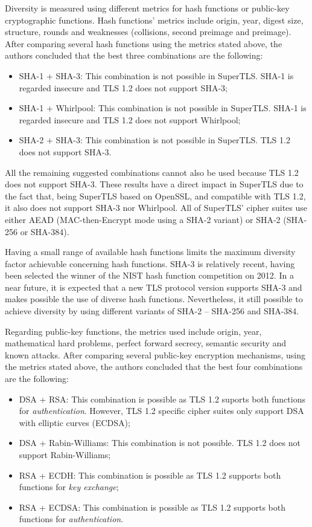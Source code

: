 \documentclass{sig-alternate-05-2015}
\begin{document}
Diversity is measured using different metrics for hash functions or public-key cryptographic functions. Hash functions' metrics include origin, year, digest size, structure, rounds and weaknesses (collisions, second preimage and preimage).
After comparing several hash functions using the metrics stated above, the authors concluded that the best three combinations are the following:
\begin{itemize}
\item {SHA-1 + SHA-3: This combination is not possible in SuperTLS. SHA-1 is regarded insecure and TLS 1.2 does not support SHA-3;}
\item {SHA-1 + Whirlpool: This combination is not possible in SuperTLS. SHA-1 is regarded insecure and TLS 1.2 does not support Whirlpool;} 
\item {SHA-2 + SHA-3: This combination is not possible in SuperTLS. TLS 1.2 does not support SHA-3.}
\end{itemize}

All the remaining suggested combinations cannot also be used because TLS 1.2 does not support SHA-3.
These results have a direct impact in SuperTLS due to the fact that, being SuperTLS based on OpenSSL, and compatible with TLS 1.2, it also does not support SHA-3 nor Whirlpool. All of SuperTLS' cipher suites use either AEAD (MAC-then-Encrypt mode using a SHA-2 variant) or SHA-2 (SHA-256 or SHA-384).

Having a small range of available hash functions limits the maximum diversity factor achievable concerning hash functions.
SHA-3 is relatively recent, having been selected the winner of the NIST hash function competition on 2012. In a near future, it is expected that a new TLS protocol version supports SHA-3 and makes possible the use of diverse hash functions.
Nevertheless, it still possible to achieve diversity by using different variants of SHA-2 -- SHA-256 and SHA-384.

Regarding public-key functions, the metrics used include origin, year, mathematical hard problems, perfect forward secrecy, semantic security and known attacks.
After comparing several public-key encryption mechanisms, using the metrics stated above, the authors concluded that the best four combinations are the following:
\begin{itemize}
\item {DSA + RSA: This combination is possible as TLS 1.2 suports both functions for \textit{authentication}. However, TLS 1.2 specific cipher suites only support DSA with elliptic curves (ECDSA);}
\item {DSA + Rabin-Williams: This combination is not possible. TLS 1.2 does not support Rabin-Williams;}
\item {RSA + ECDH: This combination is possible as TLS 1.2 supports both functions for \textit{key exchange};}
\item {RSA + ECDSA: This combination is possible as TLS 1.2 supports both functions for \textit{authentication}.}
\end{itemize}
\end{document}
